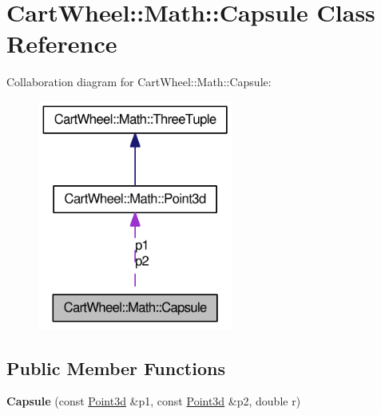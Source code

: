 \hypertarget{classCartWheel_1_1Math_1_1Capsule}{
\section{CartWheel::Math::Capsule Class Reference}
\label{classCartWheel_1_1Math_1_1Capsule}
}


Collaboration diagram for CartWheel::Math::Capsule:\nopagebreak
\begin{figure}[H]
\begin{center}
\leavevmode
\includegraphics[width=182pt]{classCartWheel_1_1Math_1_1Capsule__coll__graph}
\end{center}
\end{figure}
\subsection*{Public Member Functions}
\begin{DoxyCompactItemize}
\item 
\hypertarget{classCartWheel_1_1Math_1_1Capsule_a34f47b3ab4b4be39636a5ca30d774905}{
{\bfseries Capsule} (const \hyperlink{classCartWheel_1_1Math_1_1Point3d}{Point3d} \&p1, const \hyperlink{classCartWheel_1_1Math_1_1Point3d}{Point3d} \&p2, double r)}
\label{classCartWheel_1_1Math_1_1Capsule_a34f47b3ab4b4be39636a5ca30d774905}

\end{DoxyCompactItemize}
